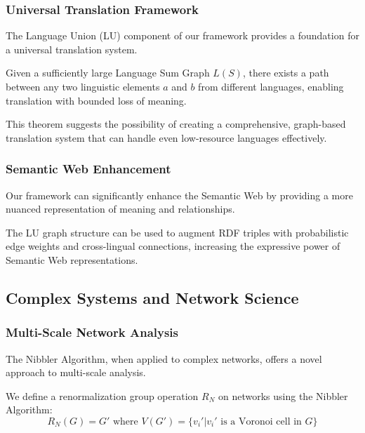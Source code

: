 \subsubsection{Universal Translation Framework}

The Language Union (LU) component of our framework provides a foundation for a universal translation system.

\begin{theorem}
Given a sufficiently large Language Sum Graph $L(S)$, there exists a path between any two linguistic elements $a$ and $b$ from different languages, enabling translation with bounded loss of meaning.
\end{theorem}

This theorem suggests the possibility of creating a comprehensive, graph-based translation system that can handle even low-resource languages effectively.

\subsubsection{Semantic Web Enhancement}

Our framework can significantly enhance the Semantic Web by providing a more nuanced representation of meaning and relationships.

\begin{proposition}
The LU graph structure can be used to augment RDF triples with probabilistic edge weights and cross-lingual connections, increasing the expressive power of Semantic Web representations.
\end{proposition}

\subsection{Complex Systems and Network Science}

\subsubsection{Multi-Scale Network Analysis}

The Nibbler Algorithm, when applied to complex networks, offers a novel approach to multi-scale analysis.

\begin{definition}
We define a renormalization group operation $R_N$ on networks using the Nibbler Algorithm:
\begin{equation}
    R_N(G) = G' \text{ where } V(G') = \{v_i' | v_i' \text{ is a Voronoi cell in } G\}
\end{equation}
\end{definition}


